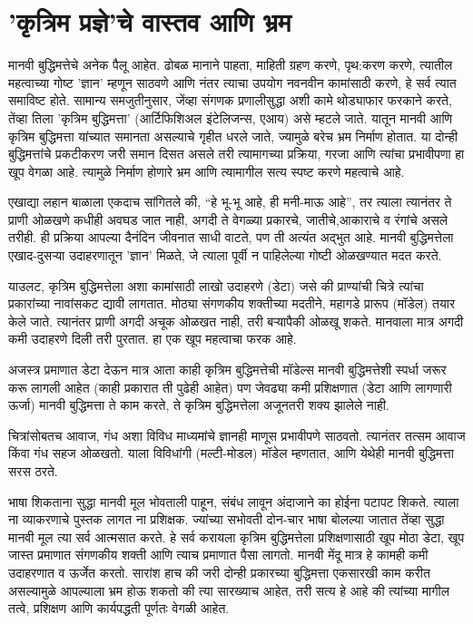 \chapter{'कृत्रिम प्रज्ञे'चे वास्तव आणि भ्रम}

मानवी बुद्धिमत्तेचे अनेक पैलू आहेत. ढोबळ मानाने पाहता, माहिती ग्रहण करणे, पृथ:करण करणे, त्यातील महत्वाच्या गोष्ट 'ज्ञान' म्हणून साठवणे आणि नंतर त्याचा उपयोग नवनवीन कामांसाठी करणे, हे सर्व त्यात समाविष्ट होते. सामान्य समजुतीनुसार, जेंव्हा संगणक प्रणालीसुद्धा अशी कामे थोड्याफार फरकाने करते, तेंव्हा तिला 'कृत्रिम बुद्धिमत्ता' (आर्टिफिशिअल इंटेलिजन्स, एआय) असे म्हटले जाते. यातून मानवी आणि कृत्रिम बुद्धिमत्ता यांच्यात समानता असल्याचे गृहीत धरले जाते, ज्यामुळे बरेच भ्रम निर्माण होतात. या दोन्ही बुद्धिमत्तांचे प्रकटीकरण जरी समान दिसत असले तरी त्यामागच्या प्रक्रिया, गरजा आणि त्यांचा प्रभावीपणा हा खूप वेगळा आहे. त्यामुळे निर्माण होणारे भ्रम आणि त्यामागील सत्य स्पष्ट करणे महत्वाचे आहे.

एखाद्या लहान बाळाला एकदाच सांगितले की, ``हे भू-भू आहे, ही मनी-माऊ आहे'', तर त्याला त्यानंतर ते प्राणी ओळखणे कधीही अवघड जात नाही, अगदी ते वेगळ्या प्रकारचे, जातीचे,आकाराचे व रंगांचे असले तरीही. ही प्रक्रिया आपल्या दैनंदिन जीवनात साधी वाटते, पण ती अत्यंत अद्भुत आहे. मानवी बुद्धिमत्तेला एखाद-दुसऱ्या उदाहरणातून 'ज्ञान' मिळते, जे त्याला पूर्वी न पाहिलेल्या गोष्टी ओळखण्यात मदत करते.

याउलट, कृत्रिम बुद्धिमत्तेला अशा कामांसाठी लाखो उदाहरणे (डेटा) जसे की प्राण्यांची चित्रे त्यांचा प्रकारांच्या नावांसकट द्यावी लागतात. मोठ्या संगणकीय शक्तीच्या मदतीने, महागडे प्रारूप (मॉडेल) तयार केले जाते. त्यानंतर प्राणी अगदी अचूक ओळखत नाही, तरी बऱ्यापैकी ओळखू शकते. मानवाला मात्र अगदी कमी उदाहरणे दिली तरी पुरतात. हा एक खूप महत्वाचा फरक आहे. 

अजस्त्र प्रमाणात डेटा देऊन मात्र आता काही कृत्रिम बुद्धिमत्तेची मॉडेल्स मानवी बुद्धिमत्तेशी स्पर्धा जरूर करू लागली आहेत (काही प्रकारात ती पुढेही आहेत) पण जेवढ्या कमी प्रशिक्षणात (डेटा आणि लागणारी ऊर्जा) मानवी बुद्धिमत्ता ते काम करते, ते कृत्रिम बुद्धिमत्तेला अजूनतरी शक्य झालेले नाही. 

चित्रांसोबतच आवाज, गंध अशा विविध माध्यमांचे ज्ञानही माणूस प्रभावीपणे साठवतो. त्यानंतर तत्सम आवाज किंवा गंध सहज ओळखतो. याला विविधांगी (मल्टी-मोडल) मॉडेल म्हणतात, आणि येथेही मानवी बुद्धिमत्ता सरस ठरते.

भाषा शिकताना सुद्धा मानवी मूल भोवताली पाहून, संबंध लावून अंदाजाने का होईना पटापट शिकते. त्याला ना व्याकरणाचे पुस्तक लागत ना प्रशिक्षक. ज्यांच्या सभोवती दोन-चार भाषा बोलल्या जातात तेंव्हा सुद्धा मानवी मूल त्या सर्व आत्मसात करते. हे सर्व करायला कृत्रिम बुद्धिमत्तेला प्रशिक्षणासाठी खूप मोठा डेटा, खूप जास्त प्रमाणात संगणकीय शक्ती आणि त्याच प्रमाणात पैसा लागतो. मानवी मेंदू मात्र हे कामही कमी उदाहरणात व ऊर्जेत करतो. सारांश हाच की  जरी दोन्ही प्रकारच्या बुद्धिमत्ता एकसारखी काम करीत असल्यामुळे आपल्याला भ्रम होऊ शकतो की त्या सारख्याच आहेत, तरी सत्य हे आहे की त्यांच्या मागील तत्वे, प्रशिक्षण आणि कार्यपद्धती पूर्णतः वेगळी आहेत. 

